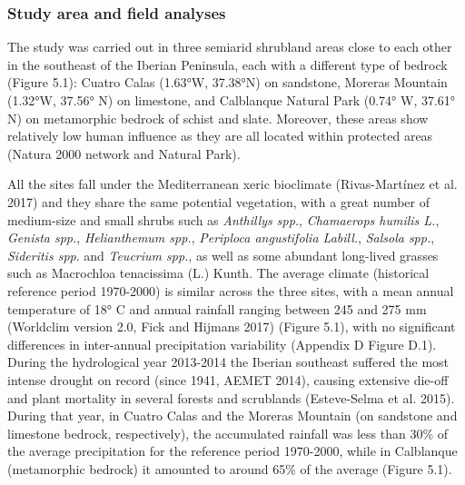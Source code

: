 \documentclass[11pt,twoside]{reedthesis}
\begin{document}
\subsubsection{Study area and field
analyses}\label{study-area-and-field-analyses}

The study was carried out in three semiarid shrubland areas close to
each other in the southeast of the Iberian Peninsula, each with a
different type of bedrock (Figure 5.1): Cuatro Calas (1.63°W, 37.38°N)
on sandstone, Moreras Mountain (1.32°W, 37.56° N) on limestone, and
Calblanque Natural Park (0.74° W, 37.61° N) on metamorphic bedrock of
schist and slate. Moreover, these areas show relatively low human
influence as they are all located within protected areas (Natura 2000
network and Natural Park).\par

All the sites fall under the Mediterranean xeric bioclimate
(Rivas-Martínez et al. 2017) and they share the same potential
vegetation, with a great number of medium-size and small shrubs such as
\emph{Anthillys spp.}, \emph{Chamaerops humilis L.}, \emph{Genista
spp.}, \emph{Helianthemum spp.}, \emph{Periploca angustifolia Labill.},
\emph{Salsola spp.}, \emph{Sideritis spp}. and \emph{Teucrium spp.}, as
well as some abundant long-lived grasses such as Macrochloa tenacissima
(L.) Kunth. The average climate (historical reference period 1970-2000)
is similar across the three sites, with a mean annual temperature of 18°
C and annual rainfall ranging between 245 and 275 mm (Worldclim version
2.0, Fick and Hijmans 2017) (Figure 5.1), with no significant
differences in inter-annual precipitation variability (Appendix D Figure
D.1). During the hydrological year 2013-2014 the Iberian southeast
suffered the most intense drought on record (since 1941, AEMET 2014),
causing extensive die-off and plant mortality in several forests and
scrublands (Esteve-Selma et al. 2015). During that year, in Cuatro Calas
and the Moreras Mountain (on sandstone and limestone bedrock,
respectively), the accumulated rainfall was less than 30\% of the
average precipitation for the reference period 1970-2000, while in
Calblanque (metamorphic bedrock) it amounted to around 65\% of the
average (Figure 5.1).\par
\end{document}
